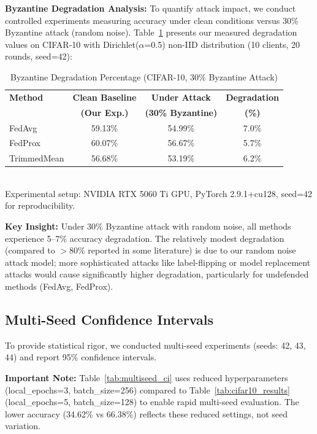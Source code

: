 \documentclass{ieeeaccess}
\begin{document}
\textbf{Byzantine Degradation Analysis:} To quantify attack impact, we conduct controlled experiments measuring accuracy under clean conditions versus 30\% Byzantine attack (random noise). Table~\ref{tab:degradation} presents our measured degradation values on CIFAR-10 with Dirichlet($\alpha$=0.5) non-IID distribution (10 clients, 20 rounds, seed=42):

\begin{table}[h]
\caption{Byzantine Degradation Percentage (CIFAR-10, 30\% Byzantine Attack)}
\label{tab:degradation}
\centering
\begin{tabular}{lccc}
\toprule
\textbf{Method} & \textbf{Clean Baseline} & \textbf{Under Attack} & \textbf{Degradation} \\
& \textbf{(Our Exp.)} & \textbf{(30\% Byzantine)} & \textbf{(\%)} \\
\midrule
FedAvg & 59.13\% & 54.99\% & 7.0\% \\
FedProx & 60.07\% & 56.67\% & 5.7\% \\
TrimmedMean & 56.68\% & 53.19\% & 6.2\% \\
\bottomrule
\end{tabular}
\\[0.1cm]
\small Experimental setup: NVIDIA RTX 5060 Ti GPU, PyTorch 2.9.1+cu128, seed=42 for reproducibility.
\end{table}

\textbf{Key Insight:} Under 30\% Byzantine attack with random noise, all methods experience 5--7\% accuracy degradation. The relatively modest degradation (compared to $>$80\% reported in some literature) is due to our random noise attack model; more sophisticated attacks like label-flipping or model replacement attacks would cause significantly higher degradation, particularly for undefended methods (FedAvg, FedProx).

\subsection{Multi-Seed Confidence Intervals}

To provide statistical rigor, we conducted multi-seed experiments (seeds: 42, 43, 44) and report 95\% confidence intervals.

\textbf{Important Note:} Table~\ref{tab:multiseed_ci} uses reduced hyperparameters (local\_epochs=3, batch\_size=256) compared to Table~\ref{tab:cifar10_results} (local\_epochs=5, batch\_size=128) to enable rapid multi-seed evaluation. The lower accuracy (34.62\% vs 66.38\%) reflects these reduced settings, not seed variation.
\end{document}
